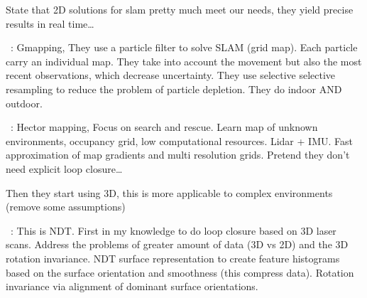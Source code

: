 State that 2D solutions for slam pretty much meet our needs, they yield precise results in real time\dots

~\cite{Grisetti2007}: Gmapping,
They use a particle filter to solve SLAM (grid map). Each particle carry an individual map. They take into account the movement but also the most recent observations, which decrease uncertainty. They use selective selective resampling to reduce the problem of particle depletion. They do indoor AND outdoor. 

~\cite{Kohlbrecher2011}: Hector mapping,
Focus on search and rescue. Learn map of unknown environments, occupancy grid, low computational resources. Lidar + IMU. Fast approximation of map gradients and multi resolution grids. Pretend they don't need explicit loop closure\dots


Then they start using 3D, this is more applicable to complex environments (remove some assumptions)

~\cite{Magnusson2009}:
This is NDT. First in my knowledge to do loop closure based on 3D laser scans. Address the problems of greater amount of data (3D vs 2D) and the 3D rotation invariance. NDT surface representation to create feature histograms based on the surface orientation and smoothness (this compress data). Rotation invariance via alignment of dominant surface orientations.

~\cite{}
